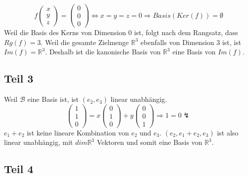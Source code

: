 \documentclass[a4paper,10pt]{article}
\begin{document}
\begin{equation}
 f\begin{pmatrix}
   x\\
   y\\
   z
  \end{pmatrix}
  =
  \begin{pmatrix}
   0\\
   0\\
   0
  \end{pmatrix}
 \Leftrightarrow
 x = y = z = 0 \Rightarrow Basis(Ker(f)) = \emptyset
\end{equation}
Weil die Basis des Kerns von Dimension $0$ ist, folgt nach dem Rangsatz, dass $Rg(f) = 3$.
Weil die gesamte Zielmenge $\mathbb{R}^3$ ebenfalls von Dimension $3$ ist, ist $Im(f) = \mathbb{R}^3$.
Deshalb ist die kanonische Basis von $\mathbb{R}^3$ eine Basis von $Im(f)$.

\subsection*{Teil 3}

Weil $\mathcal{B}$ eine Basis ist, ist $(e_2, e_3)$ linear unabhängig.
\begin{equation}
 \begin{pmatrix}
  1\\
  1\\
  0
 \end{pmatrix}
 =
 x
 \begin{pmatrix}
  0\\
  1\\
  0
 \end{pmatrix}
 + y
 \begin{pmatrix}
  0\\
  0\\
  1
 \end{pmatrix}
 \Rightarrow
 1 = 0 \lightning
\end{equation}
$e_1 + e_2$ ist keine lineare Kombination von $e_2$ und $e_3$.
$(e_2, e_1 + e_2, e_3)$ ist also linear unabhängig, mit $dim \mathbb{R}^3$ Vektoren und somit eine Basis von $\mathbb{R}^3$.

\subsection*{Teil 4}
\end{document}
